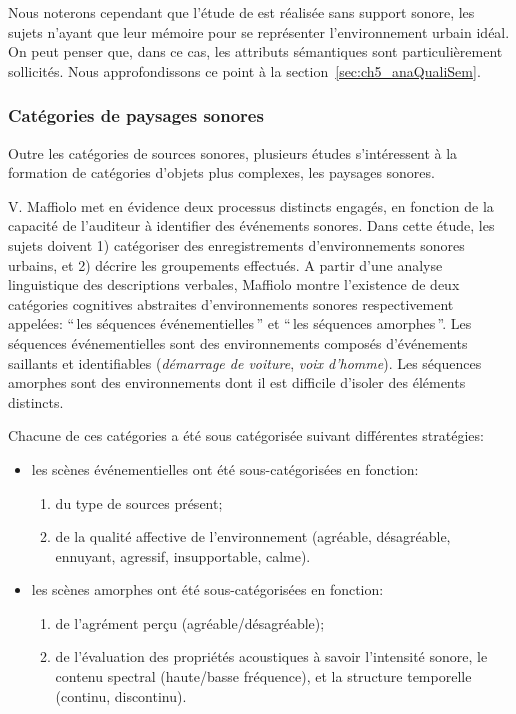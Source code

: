{{Nous noterons cependant que l'étude de \citep{guastavino2006ideal} est réalisée sans support sonore, les sujets n'ayant que leur mémoire pour se représenter l'environnement urbain idéal. On peut penser que, dans ce cas, les attributs sémantiques sont particulièrement sollicités. Nous approfondissons ce point à la section~\ref{sec:ch5_anaQualiSem}.  

\subsubsection{Catégories de paysages sonores}
\label{sec:ch3_catsoundscape}

Outre les catégories de sources sonores, plusieurs études s’intéressent à la formation de catégories d'objets plus complexes, les paysages sonores.

V. Maffiolo \citep{maffiolo_caracterisation_1999} met en évidence deux processus distincts engagés, en fonction de la capacité de l'auditeur à identifier des événements sonores. Dans cette étude, les sujets doivent 1) catégoriser des enregistrements d'environnements sonores urbains, et 2) décrire les groupements effectués. A partir d'une analyse linguistique des descriptions verbales, Maffiolo montre l'existence de deux catégories cognitives abstraites d'environnements sonores respectivement appelées: ``\,les séquences événementielles\,'' et ``\,les séquences amorphes\,''. Les séquences événementielles sont des environnements composés d'événements saillants et identifiables (\emph{démarrage de voiture}, \emph{voix d'homme}). Les séquences amorphes sont des environnements dont il est difficile d'isoler des éléments distincts.

Chacune de ces catégories a été sous catégorisée suivant différentes stratégies:

\begin{itemize}
\item les scènes événementielles ont été sous-catégorisées en fonction:
\begin{enumerate}
\item du type de sources présent;
\item de la qualité affective de l'environnement (agréable, désagréable, ennuyant, agressif, insupportable, calme).
\end{enumerate}
\item les scènes amorphes ont été sous-catégorisées en fonction:
\begin{enumerate}
\item de l'agrément perçu (agréable/désagréable);
\item de l'évaluation des propriétés acoustiques à savoir l'intensité sonore, le contenu spectral (haute/basse fréquence), et la structure temporelle (continu, discontinu).
\end{enumerate}
\end{itemize}

}}
